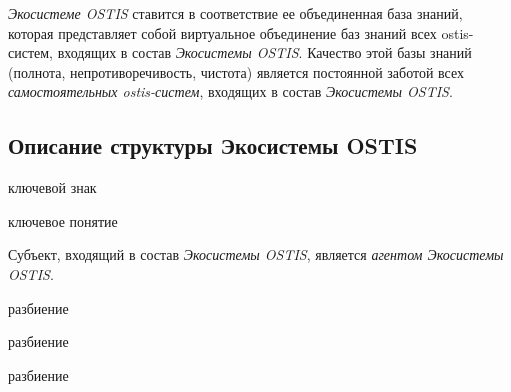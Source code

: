 \textit{Экосистеме OSTIS} ставится в соответствие ее объединенная база знаний, которая представляет собой виртуальное объединение баз знаний всех ostis-систем, входящих в состав \textit{Экосистемы OSTIS}.
Качество этой базы знаний (полнота, непротиворечивость, чистота) является постоянной заботой всех \textit{самостоятельных ostis-систем}, входящих в состав \textit{Экосистемы OSTIS}.


\subsection{Описание структуры Экосистемы OSTIS}
{\label{sec_ecosystem_structure_description}} 

\begin{SCn}
\begin{scnrelfromlist}{ключевой знак}
\end{scnrelfromlist}

\begin{scnrelfromlist}{ключевое понятие}
\end{scnrelfromlist}
\end{SCn}

Субъект, входящий в состав \textit{Экосистемы OSTIS}, является \textit{агентом Экосистемы OSTIS}.

\begin{SCn}
\begin{scnrelfromset}{разбиение}
	\begin{scnindent}
    \begin{scnrelfromset}{разбиение}
    \end{scnrelfromset}
	\end{scnindent}
	\begin{scnindent}
    \begin{scnrelfromset}{разбиение}
    \end{scnrelfromset}
	\end{scnindent}
\end{scnrelfromset}
\end{SCn}

